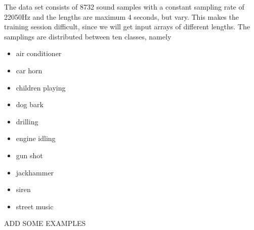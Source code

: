 The data set consists of 8732 sound samples with a constant sampling rate of 22050Hz and the lengths are maximum 4 seconds, but vary. This makes the training session difficult, since we will get input arrays of different lengths. The samplings are distributed between ten classes, namely
\begin{multicols}{2}
\begin{itemize}
	\setlength\itemsep{0.2em}
	\item air conditioner
	\item car horn
	\item children playing
	\item dog bark
	\item drilling
\end{itemize}

\columnbreak

\begin{itemize}
	\setlength\itemsep{0.2em}
	\item engine idling
	\item gun shot
	\item jackhammer
	\item siren
	\item street music
\end{itemize}
\end{multicols}

ADD SOME EXAMPLES